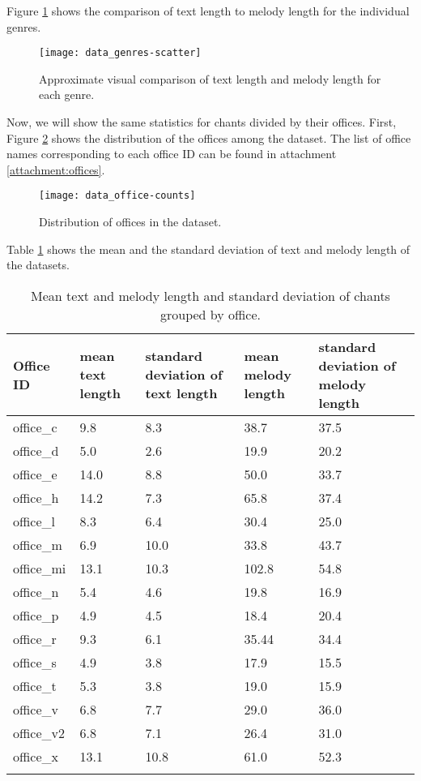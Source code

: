 Figure \ref{fig:genres-scatter} shows the comparison of text length to melody length for the individual genres.

\begin{figure}[h!]
\centering
\texttt{[image: data\_genres-scatter]}
\caption{Approximate visual comparison of text length and melody length for each genre.}
\label{fig:genres-scatter}
\end{figure}

Now, we will show the same statistics for chants divided by their offices. First, Figure \ref{fig:office-counts} shows the distribution of the offices
among the dataset. The list of office names corresponding to each office ID can be found in attachment \ref{attachment:offices}.

\begin{figure}[h!]
\centering
\texttt{[image: data\_office-counts]}
\caption{Distribution of offices in the dataset.}
\label{fig:office-counts}
\end{figure}

Table \ref{table:offices} shows the mean and the standard deviation of text and melody length of the datasets.

\begin{longtable}{| p{} | p{} | p{} | p{} | p{} |}

\hline
Office ID & mean text length & standard deviation of text length & mean melody length & standard deviation of melody length \\
\hline
office\_c & 9.8 & 8.3 & 38.7 & 37.5 \\
office\_d & 5.0 & 2.6 & 19.9 & 20.2 \\
office\_e & 14.0 & 8.8 & 50.0 & 33.7 \\
office\_h & 14.2 & 7.3 & 65.8 & 37.4 \\
office\_l & 8.3 & 6.4 & 30.4 & 25.0 \\
office\_m & 6.9 & 10.0 & 33.8 & 43.7 \\
office\_mi & 13.1 & 10.3 & 102.8 & 54.8 \\
office\_n & 5.4 & 4.6 & 19.8 & 16.9 \\
office\_p & 4.9 & 4.5 & 18.4 & 20.4 \\
office\_r & 9.3 & 6.1 & 35.44 & 34.4 \\
office\_s & 4.9 & 3.8 & 17.9 & 15.5 \\
office\_t & 5.3 & 3.8 & 19.0 & 15.9 \\
office\_v & 6.8 & 7.7 & 29.0 & 36.0 \\
office\_v2 & 6.8 & 7.1 & 26.4 & 31.0 \\
office\_x & 13.1 & 10.8 & 61.0 & 52.3 \\
\hline

\caption{Mean text and melody length and standard deviation of chants grouped by office.}
\label{table:offices}
\end{longtable}

